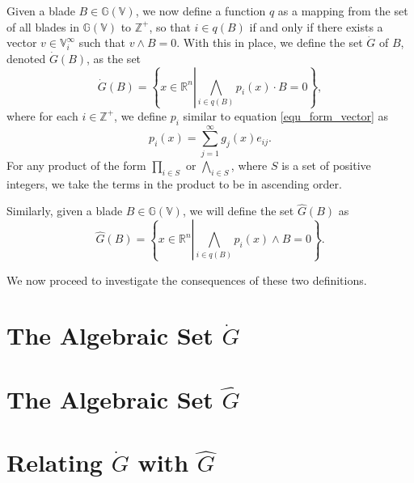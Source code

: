 \documentclass{birkjour}
\theoremstyle{definition}
\theoremstyle{remark}
\numberwithin{equation}{section}
\newcommand{\G}{\mathbb{G}}
\newcommand{\V}{\mathbb{V}}
\newcommand{\R}{\mathbb{R}}
\newcommand{\Z}{\mathbb{Z}}
\newcommand{\Gi}{\dot{G}}
\newcommand{\Go}{\hat{G}}
\begin{document}
Given a blade $B\in\G(\V)$, we now define a function $q$ as a mapping from
the set of all blades in $\G(\V)$ to $\Z^+$, so that $i\in q(B)$ if and only if
there exists a vector $v\in\V_i^\infty$ such that $v\wedge B=0$.  With this in place,
we define the set $\Gi$ of $B$, denoted $\Gi(B)$, as the set
\begin{equation}
\Gi(B) = \left\{x\in\R^n\left|\bigwedge_{i\in q(B)} p_i(x)\cdot B=0\right.\right\},
\end{equation}
where for each $i\in\Z^+$, we define $p_i$ similar to equation \eqref{equ_form_vector} as
\begin{equation}
p_i(x) = \sum_{j=1}^\infty g_j(x)e_{ij}.
\end{equation}
For any product of the form $\prod_{i\in S}$ or $\bigwedge_{i\in S}$, where $S$ is
a set of positive integers, we take the terms in the product to be in ascending order.

Similarly, given a blade $B\in\G(\V)$, we will define the set $\Go(B)$ as
\begin{equation}
\Go(B) = \left\{x\in\R^n\left|\bigwedge_{i\in q(B)}p_i(x)\wedge B=0\right.\right\}.
\end{equation}

We now proceed to investigate the consequences of these two definitions.

\section{The Algebraic Set $\Gi$}

\section{The Algebraic Set $\Go$}

\section{Relating $\Gi$ with $\Go$}
\end{document}
